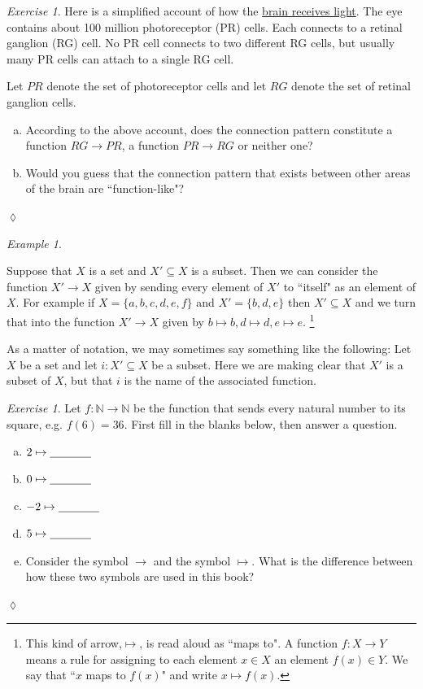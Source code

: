 \documentclass{book}
\def\NN{{\mathbb N}}
\def\to{\rightarrow}
\def\taking{\colon}
\def\ss{\subseteq}
\def\ul{\underline}
\theoremstyle{remark}
\newtheorem{example}[subsubsection]{Example}
\newtheorem{exc}[subsubsection]{Exercise}
\newenvironment{exercise}{\begin{exc}}{\hspace*{\fill}$\lozenge$\end{exc}}
\theoremstyle{definition}
\def\sexc{\begin{enumerate}[a.)]\setlength{\itemsep}{.1cm}\setlength{\parskip}{.1cm}\item}
\def\next{\item}
\def\endsexc{\end{enumerate}}
\begin{document}
\begin{exercise}

Here is a simplified account of how the \href{http://en.wikipedia.org/wiki/Retina}{\text brain receives light}. The eye contains about 100 million photoreceptor (PR) cells. Each connects to a retinal ganglion (RG) cell. No PR cell connects to two different RG cells, but usually many PR cells can attach to a single RG cell. 

Let $PR$ denote the set of photoreceptor cells and let $RG$ denote the set of retinal ganglion cells. 
\sexc According to the above account, does the connection pattern constitute a function $RG\to PR$, a function $PR\to RG$ or neither one? 
\next Would you guess that the connection pattern that exists between other areas of the brain are ``function-like"?
\endsexc
\end{exercise}

\begin{example}\label{ex:subset as function}

Suppose that $X$ is a set and $X'\ss X$ is a subset. Then we can consider the function $X'\to X$ given by sending every element of $X'$ to ``itself" as an element of $X$. For example if $X=\{a,b,c,d,e,f\}$ and $X'=\{b,d,e\}$ then $X'\ss X$ and we turn that into the function $X'\to X$ given by $b\mapsto b, d\mapsto d, e\mapsto e$.
\footnote{This kind of arrow,\;\;$\mapsto$\;\;, is read aloud as ``maps to". A function $f\taking X\to Y$ means a rule for assigning to each element $x\in X$ an element $f(x)\in Y$. We say that ``$x$ maps to $f(x)$" and write $x\mapsto f(x)$.}

As a matter of notation, we may sometimes say something like the following: Let $X$ be a set and let $i\taking X'\ss X$ be a subset. Here we are making clear that $X'$ is a subset of $X$, but that $i$ is the name of the associated function.

\end{example}

\begin{exercise}
Let $f\taking\NN\to\NN$ be the function that sends every natural number to its square, e.g. $f(6)=36$. First fill in the blanks below, then answer a question.
\sexc $2\mapsto\ul{\hspace{.5in}}$
\next $0\mapsto\ul{\hspace{.5in}}$
\next $-2\mapsto\ul{\hspace{.5in}}$
\next $5\mapsto\ul{\hspace{.5in}}$
\next Consider the symbol $\to$ and the symbol $\mapsto$. What is the difference between how these two symbols are used in this book?
\endsexc
\end{exercise}
\end{document}
